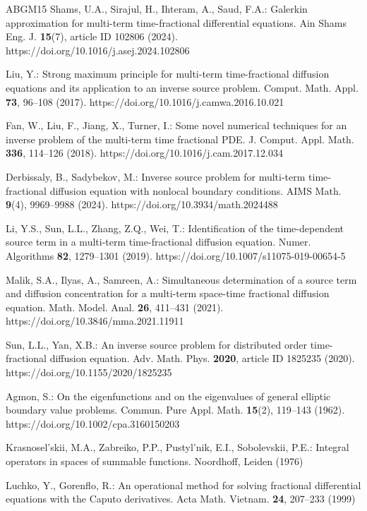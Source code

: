 \documentclass[12pt, reqno]{amsart}
\theoremstyle{definition}
\theoremstyle{remark}
\numberwithin{equation}{section}
\begin{document}
\begin{thebibliography}{ABGM15}
 Shams, U.A., Sirajul, H., Ihteram, A., Saud, F.A.: Galerkin approximation for multi-term time-fractional differential equations. Ain Shams Eng. J. \textbf{15}(7), article ID 102806 (2024). https://doi.org/10.1016/j.asej.2024.102806

 Liu, Y.: Strong maximum principle for multi-term time-fractional diffusion equations and its application to an inverse source problem. Comput. Math. Appl. \textbf{73}, 96–108 (2017). https://doi.org/10.1016/j.camwa.2016.10.021

 Fan, W., Liu, F., Jiang, X., Turner, I.: Some novel numerical techniques for an inverse problem of the multi-term time fractional PDE. J. Comput. Appl. Math. \textbf{336}, 114–126 (2018). https://doi.org/10.1016/j.cam.2017.12.034

 Derbissaly, B., Sadybekov, M.: Inverse source problem for multi-term time-fractional diffusion equation with nonlocal boundary conditions. AIMS Math. \textbf{9}(4), 9969–9988 (2024). https://doi.org/10.3934/math.2024488

 Li, Y.S., Sun, L.L., Zhang, Z.Q., Wei, T.: Identification of the time-dependent source term in a multi-term time-fractional diffusion equation. Numer. Algorithms \textbf{82}, 1279–1301 (2019). https://doi.org/10.1007/s11075-019-00654-5

 Malik, S.A., Ilyas, A., Samreen, A.: Simultaneous determination of a source term and diffusion concentration for a multi-term space-time fractional diffusion equation. Math. Model. Anal. \textbf{26}, 411–431 (2021). https://doi.org/10.3846/mma.2021.11911

 Sun, L.L., Yan, X.B.: An inverse source problem for distributed order time-fractional diffusion equation. Adv. Math. Phys. \textbf{2020}, article ID  1825235 (2020). https://doi.org/10.1155/2020/1825235

 Agmon, S.: On the eigenfunctions and on the eigenvalues of general elliptic boundary value problems. Commun. Pure Appl. Math. \textbf{15}(2), 119–143 (1962). https://doi.org/10.1002/cpa.3160150203

 Krasnosel’skii, M.A., Zabreiko, P.P., Pustyl’nik, E.I., Sobolevskii, P.E.: Integral operators in spaces of summable functions. Noordhoff, Leiden (1976)

 Luchko, Y., Gorenflo, R.: An operational method for solving fractional differential equations with the Caputo derivatives. Acta Math. Vietnam. \textbf{24}, 207–233 (1999)


\end{thebibliography}
\end{document}
